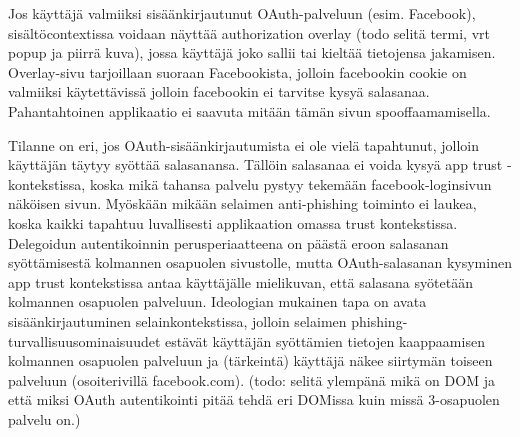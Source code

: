 \documentclass[finnish,gradu]{tktltiki}
\begin{document}




  Jos käyttäjä valmiiksi sisäänkirjautunut OAuth-palveluun (esim. Facebook), sisältöcontextissa voidaan näyttää authorization overlay (todo selitä termi, vrt popup ja piirrä kuva), jossa käyttäjä joko sallii tai kieltää tietojensa jakamisen. Overlay-sivu tarjoillaan suoraan Facebookista, jolloin facebookin cookie on valmiiksi käytettävissä jolloin facebookin ei tarvitse kysyä salasanaa. Pahantahtoinen applikaatio ei saavuta mitään tämän sivun spooffaamamisella.

  Tilanne on eri, jos OAuth-sisäänkirjautumista ei ole vielä tapahtunut, jolloin käyttäjän täytyy syöttää salasanansa. Tällöin salasanaa ei voida kysyä app trust -kontekstissa, koska mikä tahansa palvelu pystyy tekemään facebook-loginsivun näköisen sivun. Myöskään mikään selaimen anti-phishing toiminto ei laukea, koska kaikki tapahtuu luvallisesti applikaation omassa trust kontekstissa. Delegoidun autentikoinnin perusperiaatteena on päästä eroon salasanan syöttämisestä kolmannen osapuolen sivustolle, mutta OAuth-salasanan kysyminen app trust kontekstissa antaa käyttäjälle mielikuvan, että salasana syötetään kolmannen osapuolen palveluun. Ideologian mukainen tapa on avata sisäänkirjautuminen selainkontekstissa, jolloin selaimen phishing-turvallisuusominaisuudet estävät käyttäjän syöttämien tietojen kaappaamisen kolmannen osapuolen palveluun ja (tärkeintä) käyttäjä näkee siirtymän toiseen palveluun (osoiterivillä facebook.com). (todo: selitä ylempänä mikä on DOM ja että miksi OAuth autentikointi pitää tehdä eri DOMissa kuin missä 3-osapuolen palvelu on.)
\end{document}
